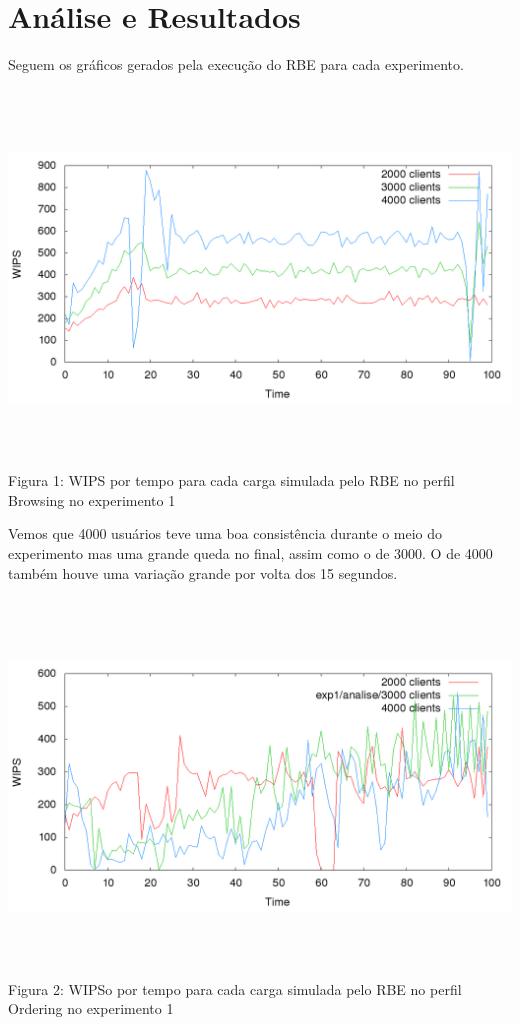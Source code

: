 \documentclass[11pt,twoside]{article}
\begin{document}
\section{An\'alise e Resultados}
\setlength{\parindent}{4ex}

Seguem os gráficos gerados pela execução do RBE para cada experimento.
\begin{center}
\includegraphics[width=15cm, height=10cm]{images/exp1/plot_browsin}
Figura 1: WIPS por tempo para cada carga simulada pelo RBE no perfil Browsing no experimento 1
\end{center}
Vemos que 4000 usuários teve uma boa consistência durante o meio do experimento mas uma grande queda no final, assim como o de 3000. O de 4000 também houve uma variação grande por volta dos 15 segundos.
\begin{center}
\includegraphics[width=15cm, height=10cm]{images/exp1/plot_ordering}
Figura 2: WIPSo por tempo para cada carga simulada pelo RBE no perfil Ordering no experimento 1
\end{center}
\end{document}
